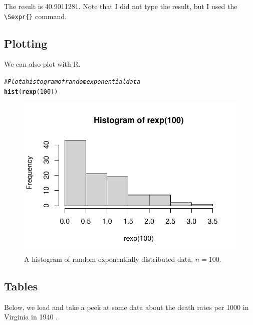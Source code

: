 \documentclass{article}\usepackage[]{graphicx}\usepackage[]{xcolor}
\makeatletter
\def\maxwidth{ %
  \ifdim\Gin@nat@width>\linewidth
    \linewidth
  \else
    \Gin@nat@width
  \fi
}
\newcommand{\hlnum}[1]{\textcolor[rgb]{0.686,0.059,0.569}{#1}}%
\newcommand{\hlcom}[1]{\textcolor[rgb]{0.678,0.584,0.686}{\textit{#1}}}%
\newcommand{\hldef}[1]{\textcolor[rgb]{0.345,0.345,0.345}{#1}}%
\newcommand{\hlkwd}[1]{\textcolor[rgb]{0.737,0.353,0.396}{\textbf{#1}}}%
\newenvironment{kframe}{%
 \def\at@end@of@kframe{}%
 \ifinner\ifhmode%
  \def\at@end@of@kframe{\end{minipage}}%
  \begin{minipage}{\columnwidth}%
 \fi\fi%
 \def\FrameCommand##1{\hskip\@totalleftmargin \hskip-\fboxsep
 \colorbox{shadecolor}{##1}\hskip-\fboxsep
     \hskip-\linewidth \hskip-\@totalleftmargin \hskip\columnwidth}%
 \MakeFramed {\advance\hsize-\width
   \@totalleftmargin\z@ \linewidth\hsize
   \@setminipage}}%
 {\par\unskip\endMakeFramed%
 \at@end@of@kframe}
\newenvironment{knitrout}{}{} %
\makeatother
\begin{document}
\begin{multicols}{2}
The result is 40.9011281. Note that I did not type the result, but I used the \verb|\Sexpr{}| command.

\subsection{Plotting}
We can also plot with R.

\begin{knitrout}\scriptsize
{}\color{fgcolor}\begin{kframe}
\begin{alltt}
\hlcom{#Plot a histogram of random exponential data}
\hlkwd{hist}\hldef{(}\hlkwd{rexp}\hldef{(}\hlnum{100}\hldef{))}
\end{alltt}
\end{kframe}
\end{knitrout}
\begin{figure}[H] \begin{center}
\begin{knitrout}
\color{fgcolor}
\includegraphics[width=\maxwidth]{figure/unnamed-chunk-6-1} 
\end{knitrout}
\caption{A histogram of random exponentially distributed data, $n=100$.} \label{plot1} %
\end{center}
\end{figure}
\columnbreak

\subsection{Tables}
Below, we load and take a peek at some data about the death rates per 1000 in Virginia in 1940 \citep{molyneaux}.


\end{multicols}
\end{document}
